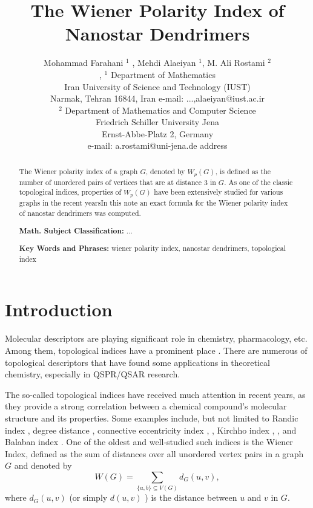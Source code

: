 \documentclass[12pt]{article}
\theoremstyle{theorem}
\theoremstyle{defi}
\begin{document}

\title{The Wiener Polarity Index of Nanostar Dendrimers}

\author{Mohammad Farahani $^1$ , Mehdi  Alaeiyan $^1$, M. Ali Rostami $^2$\\[6pt], 
$^1$ Department of Mathematics\\ Iran University of Science and Technology (IUST)\\ Narmak, Tehran 16844, Iran
e-mail: ...,alaeiyan@iust.ac.ir\\[6pt]
$^2$ Department of Mathematics and Computer Science\\ Friedrich Schiller University Jena\\
Ernst-Abbe-Platz 2, Germany \\ e-mail: a.rostami@uni-jena.de
address}


\maketitle

\begin{abstract}

The Wiener polarity index of a graph $G$, denoted by $W_p (G)$, is defined as the number of unordered pairs of vertices that are at distance $3$ in $G$. As one of the classic topological indices, properties of $W_p (G)$ have been extensively studied for various graphs in the recent yearsIn this note an exact formula for the Wiener polarity index of nanostar dendrimers was computed.

\medskip

{\bf Math. Subject Classification:} ...

{\bf Key Words and Phrases:} wiener polarity index, nanostar dendrimers, topological index

\end{abstract}

\section{Introduction}
Molecular descriptors are playing significant role in chemistry, pharmacology, etc. Among them, topological indices have a prominent place \cite{1}. There are numerous of topological descriptors that have found some applications in theoretical chemistry, especially in QSPR/QSAR research. 

The so-called topological indices have received much attention in recent years, as they provide a strong correlation between a chemical compound's molecular structure and its properties. Some examples include, but not limited to Randic index \cite{2}, degree distance \cite{3}, connective eccentricity index \cite{4}, \cite{5}, Kirchho index \cite{6} , \cite{7}, and Balaban index \cite{8}. One of the oldest and well-studied such indices is the Wiener Index, defined as the sum of distances over all unordered vertex pairs in a graph $G$ \cite{9} and denoted by 
$$W(G) = \sum_{\{u,b\}\subseteq V(G)} d_G (u,v),$$
where $d_G (u,v)$ (or simply $d (u,v)$ ) is the distance between $u$ and $v$ in $G$.
\end{document}

